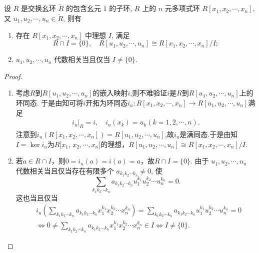 \documentclass[../../main.tex]{subfiles}%
\begin{document}
\begin{corollary}
设 \( R \) 是交换幺环 \( \widetilde{R} \) 的包含幺元 \( 1 \) 的子环, \( R \) 上的 \( n \) 元多项式环 \( R[x_1, x_2, \cdots, x_n] \), 又 \( u_1, u_2, \cdots, u_n \in \widetilde{R} \), 则有
\begin{enumerate}[(1)]
\item 存在 \( R[x_1, x_2, \cdots, x_n] \) 中理想 \( I \), 满足
\[
R \cap I = \{0\}, \quad R[u_1, u_2, \cdots, u_n] \cong R[x_1, x_2, \cdots, x_n]/I;
\]
\item \( u_1, u_2, \cdots, u_n \) 代数相关当且仅当 \( I \neq \{0\} \).
\end{enumerate}
\end{corollary}
\begin{proof}
\begin{enumerate}[(1)]
\item 考虑$R$到$R[u_1,u_2,\cdots ,u_n]$的嵌入映射$i$,则不难验证$i$是$R$到$R[u_1,u_2,\cdots ,u_n]$上的环同态. 于是由知可将$i$开拓为环同态$i_u:R[x_1, x_2, \cdots, x_n]\to R[u_1,u_2,\cdots ,u_n]$满足
\begin{align*}
i_u|_R=i,\quad i_u(x_k)=u_k(k=1,2,\cdots,n).
\end{align*}
注意到$i_u(R[x_1, x_2, \cdots, x_n])=R[u_1,u_2,\cdots ,u_n]$,故$i_u$是满同态.于是由知$I=\ker i_u$为$R$[$x_1$, $x_2, \cdots, x_n]$的理想，$R[u_1,u_2,\cdots ,u_n]\cong R[x_1, x_2, \cdots, x_n]/I$. 

\item 若$a\in R\cap I$，则$0=i_u(a)=i(a)=a$，故$R\cap I=\{0\}$. 
由于 \( u_1, u_2, \cdots, u_n \) 代数相关当且仅当存在有限多个 \( a_{k_1 k_2 \cdots k_n} \neq 0 \), 使
\[
\sum_{k_1 k_2 \cdots k_n} a_{k_1 k_2 \cdots k_n} u_1^{k_1} u_2^{k_2} \cdots u_n^{k_n} = 0.
\]
这也当且仅当
\begin{align*}
&i_u\left( \sum_{k_1k_2\cdots k_n}{a_{k_1k_2\cdots k_n}x_{1}^{k_1}x_{2}^{k_2}}\cdots x_{n}^{k_n} \right) =\sum_{k_1k_2\cdots k_n}{a_{k_1k_2\cdots k_n}u_{1}^{k_1}u_{2}^{k_2}}\cdots u_{n}^{k_n}=0
\\
&\Longleftrightarrow 0\ne \sum_{k_1k_2\cdots k_n}{a_{k_1k_2\cdots k_n}x_{1}^{k_1}x_{2}^{k_2}}\cdots x_{n}^{k_n}\in I\Longleftrightarrow I\ne \{0\}.
\end{align*}
\end{enumerate}
\end{proof}
\end{document}
